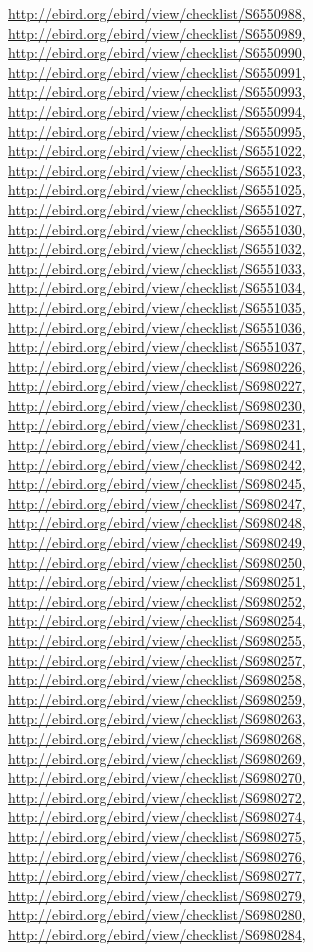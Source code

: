 \documentclass[9pt, article]{memoir}
\begin{document}
\begin{multicols}{2}
\url{http://ebird.org/ebird/view/checklist/S6550988}, 
\url{http://ebird.org/ebird/view/checklist/S6550989}, 
\url{http://ebird.org/ebird/view/checklist/S6550990}, 
\url{http://ebird.org/ebird/view/checklist/S6550991}, 
\url{http://ebird.org/ebird/view/checklist/S6550993}, 
\url{http://ebird.org/ebird/view/checklist/S6550994}, 
\url{http://ebird.org/ebird/view/checklist/S6550995}, 
\url{http://ebird.org/ebird/view/checklist/S6551022}, 
\url{http://ebird.org/ebird/view/checklist/S6551023}, 
\url{http://ebird.org/ebird/view/checklist/S6551025}, 
\url{http://ebird.org/ebird/view/checklist/S6551027}, 
\url{http://ebird.org/ebird/view/checklist/S6551030}, 
\url{http://ebird.org/ebird/view/checklist/S6551032}, 
\url{http://ebird.org/ebird/view/checklist/S6551033}, 
\url{http://ebird.org/ebird/view/checklist/S6551034}, 
\url{http://ebird.org/ebird/view/checklist/S6551035}, 
\url{http://ebird.org/ebird/view/checklist/S6551036}, 
\url{http://ebird.org/ebird/view/checklist/S6551037}, 
\url{http://ebird.org/ebird/view/checklist/S6980226}, 
\url{http://ebird.org/ebird/view/checklist/S6980227}, 
\url{http://ebird.org/ebird/view/checklist/S6980230}, 
\url{http://ebird.org/ebird/view/checklist/S6980231}, 
\url{http://ebird.org/ebird/view/checklist/S6980241}, 
\url{http://ebird.org/ebird/view/checklist/S6980242}, 
\url{http://ebird.org/ebird/view/checklist/S6980245}, 
\url{http://ebird.org/ebird/view/checklist/S6980247}, 
\url{http://ebird.org/ebird/view/checklist/S6980248}, 
\url{http://ebird.org/ebird/view/checklist/S6980249}, 
\url{http://ebird.org/ebird/view/checklist/S6980250}, 
\url{http://ebird.org/ebird/view/checklist/S6980251}, 
\url{http://ebird.org/ebird/view/checklist/S6980252}, 
\url{http://ebird.org/ebird/view/checklist/S6980254}, 
\url{http://ebird.org/ebird/view/checklist/S6980255}, 
\url{http://ebird.org/ebird/view/checklist/S6980257}, 
\url{http://ebird.org/ebird/view/checklist/S6980258}, 
\url{http://ebird.org/ebird/view/checklist/S6980259}, 
\url{http://ebird.org/ebird/view/checklist/S6980263}, 
\url{http://ebird.org/ebird/view/checklist/S6980268}, 
\url{http://ebird.org/ebird/view/checklist/S6980269}, 
\url{http://ebird.org/ebird/view/checklist/S6980270}, 
\url{http://ebird.org/ebird/view/checklist/S6980272}, 
\url{http://ebird.org/ebird/view/checklist/S6980274}, 
\url{http://ebird.org/ebird/view/checklist/S6980275}, 
\url{http://ebird.org/ebird/view/checklist/S6980276}, 
\url{http://ebird.org/ebird/view/checklist/S6980277}, 
\url{http://ebird.org/ebird/view/checklist/S6980279}, 
\url{http://ebird.org/ebird/view/checklist/S6980280}, 
\url{http://ebird.org/ebird/view/checklist/S6980284}, 

\end{multicols}
\end{document}
